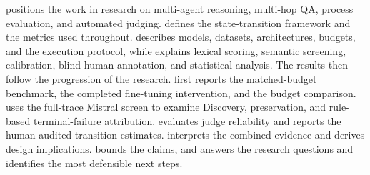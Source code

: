  positions the work in research on multi-agent reasoning, multi-hop QA, process evaluation, and automated judging.  defines the state-transition framework and the metrics used throughout.  describes models, datasets, architectures, budgets, and the execution protocol, while  explains lexical scoring, semantic screening, calibration, blind human annotation, and statistical analysis. The results then follow the progression of the research.  first reports the matched-budget benchmark, the completed fine-tuning intervention, and the budget comparison.  uses the full-trace Mistral screen to examine Discovery, preservation, and rule-based terminal-failure attribution.  evaluates judge reliability and reports the human-audited transition estimates.  interprets the combined evidence and derives design implications.  bounds the claims, and  answers the research questions and identifies the most defensible next steps.
